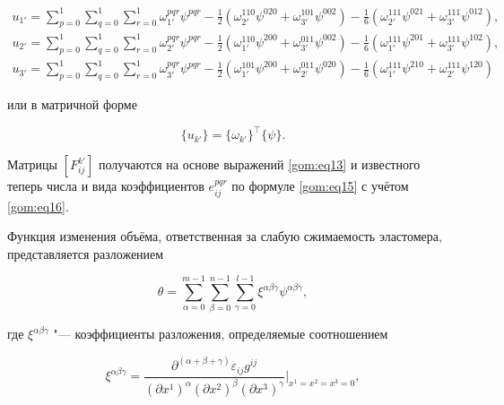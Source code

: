 \begin{gather}

u_{1'}=\sum_{p=0}^{1}\sum_{q=0}^{1}\sum_{r=0}^{1}\omega_{1'}^{pqr}\psi^{pqr}-\frac{1}{2}(\omega_{2'}^{110} \psi^{020}+\omega_{3'}^{101} \psi^{002})-\frac{1}{6}(\omega_{2'}^{111} \psi^{021}+\omega_{3'}^{111} \psi^{012}),

\\

u_{2'}=\sum_{p=0}^{1}\sum_{q=0}^{1}\sum_{r=0}^{1}\omega_{2'}^{pqr}\psi^{pqr}-\frac{1}{2}(\omega_{1'}^{110} \psi^{200}+\omega_{3'}^{011} \psi^{002})-\frac{1}{6}(\omega_{1'}^{111} \psi^{201}+\omega_{3'}^{111} \psi^{102}),

\\

u_{3'}=\sum_{p=0}^{1}\sum_{q=0}^{1}\sum_{r=0}^{1}\omega_{3'}^{pqr}\psi^{pqr}-\frac{1}{2}(\omega_{1'}^{101} \psi^{200}+\omega_{2'}^{011} \psi^{020})-\frac{1}{6}(\omega_{1'}^{111} \psi^{210}+\omega_{2'}^{111} \psi^{120})

\end{gather}

или в матричной форме

\begin{equation}

\label{gom:eq17}

\{u_{k'}\}=\{\omega_{k'}\}^\top\{\psi\}.

\end{equation}

Матрицы $[F_{ij}^{k'}]$ получаются на основе выражений \eqref{gom:eq13} и известного теперь числа и вида коэффициентов $e_{ij}^{pqr}$ по формуле \eqref{gom:eq15} с учётом \eqref{gom:eq16}.



Функция изменения объёма, ответственная за слабую сжимаемость эластомера, представляется разложением

\begin{equation}

\label{gom:eq18}

\theta=\sum_{\alpha=0}^{m-1}\sum_{\beta=0}^{n-1}\sum_{\gamma=0}^{l-1} \xi^{\alpha\beta\gamma}\psi^{\alpha\beta\gamma}, 

\end{equation}

где $\xi^{\alpha\beta\gamma}$ "--- коэффициенты разложения, определяемые соотношением

\begin{equation}

\label{gom:eq19}

\xi^{\alpha\beta\gamma}=\frac{\partial^{(\alpha+\beta+\gamma)}\varepsilon_{ij}g^{ij}}{(\partial x^1)^{\alpha}(\partial x^2)^{\beta}(\partial x^3)^{\gamma}} \Big|_{x^1=x^2=x^3=0},

\end{equation}

